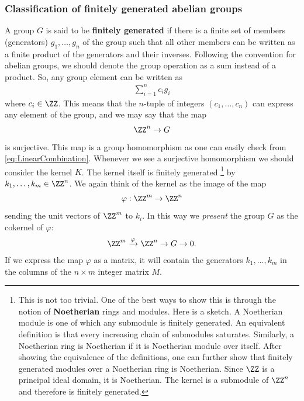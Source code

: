 \subsubsection{Classification of finitely generated abelian groups}


A group $G$ is said to be {\bf finitely generated}
if there is a finite set of members (generators) $g_1, \ldots, g_n$
of the group such that all other members
can be written as a finite product of the generators and their inverses.
Following the convention for abelian groups,
we should denote the group operation as a sum instead of a product.
So, any group element can be written as
\begin{align}
 \sum_{i=1}^n c_i g_i
 \label{eq:LinearCombination}
\end{align}
where $c_i \in \ZZ$. This means that the $n$-tuple of integers $(c_1,\ldots, c_n)$
can express any element of the group, and we may say that
the map
\begin{align}
 \ZZ^n \to G
\end{align}
is surjective.
This map is a group homomorphism as one can easily check from \eqref{eq:LinearCombination}.
Whenever we see a surjective homomorphism we should consider the kernel $K$.
The kernel itself is finitely generated%
\footnote{
This is not too trivial.
One of the best ways to show this is through the notion of {\bf Noetherian} rings and modules.
Here is a sketch.
A Noetherian module is one of which any submodule is finitely generated.
An equivalent definition is that every increasing chain of submodules
saturates.
Similarly, a Noetherian ring is Noetherian if it is Noetherian module over itself.
After showing the equivalence of the definitions,
one can further show that finitely generated modules over a Noetherian ring is Noetherian.
Since $\ZZ$ is a principal ideal domain, it is Noetherian.
The kernel is a submodule of $\ZZ^n$ and therefore is finitely generated.
}
by $k_1,\ldots, k_m \in \ZZ^n$.
We again think of the kernel as the image of the map
\begin{align}
 \varphi : \ZZ^m \to \ZZ^n
\end{align}
sending the unit vectors of $\ZZ^m$ to $k_i$.
In this way we \emph{present} the group $G$ as the cokernel of $\varphi$:
\begin{align}
\ZZ^m \xrightarrow{\varphi} \ZZ^n \to G \to 0.
\end{align}
If we express the map $\varphi$ as a matrix, it will contain the generators $k_1, \ldots, k_m$
in the columns of the $n \times m$ integer matrix $M$.

